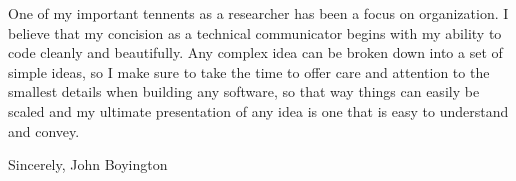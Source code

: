 \documentclass[margin, 10pt]{res} %
\begin{document}
\begin{resume}
One of my important tennents as a researcher has been a focus on organization.
I believe that my concision as a technical communicator begins with my ability to code cleanly and beautifully.
Any complex idea can be broken down into a set of simple ideas, so I make sure to take the time to offer care and attention to the smallest details when building any software, so that way things can easily be scaled and my ultimate presentation of any idea is one that is easy to understand and convey.




Sincerely,
John Boyington




\end{resume}
\end{document}
